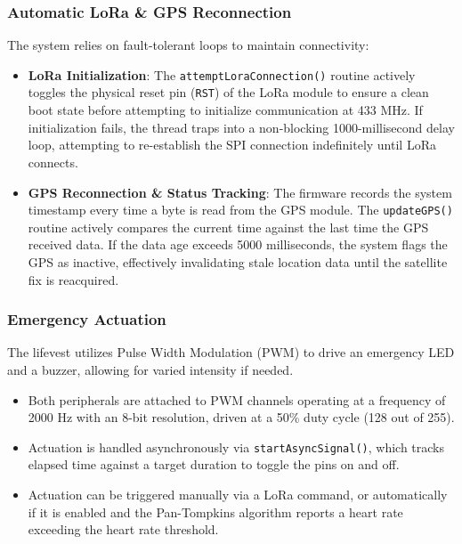 \documentclass{article}
\begin{document}
\subsubsection{Automatic LoRa \& GPS Reconnection}
The system relies on fault-tolerant loops to maintain connectivity:

\begin{itemize}
    \item \textbf{LoRa Initialization}: The \verb|attemptLoraConnection()| routine actively toggles the physical reset pin (\verb|RST|) of the LoRa module to ensure a clean boot state before attempting to initialize communication at 433 MHz. If initialization fails, the thread traps into a non-blocking 1000-millisecond delay loop, attempting to re-establish the SPI connection indefinitely until LoRa connects.

    \item \textbf{GPS Reconnection \& Status Tracking}: The firmware records the system timestamp every time a byte is read from the GPS module. The \verb|updateGPS()| routine actively compares the current time against the last time the GPS received data. If the data age exceeds 5000 milliseconds, the system flags the GPS as inactive, effectively invalidating stale location data until the satellite fix is reacquired.
\end{itemize}


\subsubsection{Emergency Actuation}
The lifevest utilizes Pulse Width Modulation (PWM) to drive an emergency LED and a buzzer, allowing for varied intensity if needed.

\begin{itemize}
    
\item Both peripherals are attached to PWM channels operating at a frequency of 2000 Hz with an 8-bit resolution, driven at a 50\% duty cycle (128 out of 255).

\item Actuation is handled asynchronously via \verb|startAsyncSignal()|, which tracks elapsed time against a target duration to toggle the pins on and off.

\item Actuation can be triggered manually via a LoRa command, or automatically if it is enabled and the Pan-Tompkins algorithm reports a heart rate exceeding the heart rate threshold.

\end{itemize}
\end{document}
